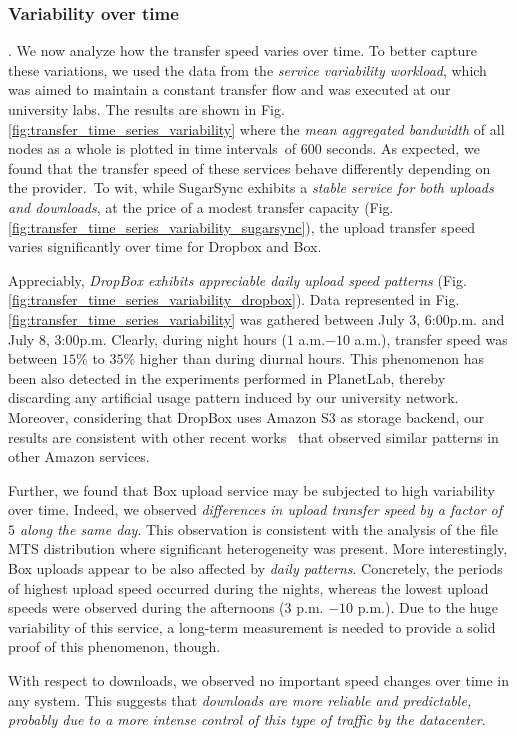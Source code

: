 \subsubsection*{Variability over time}. We now analyze how the
transfer speed varies over time. To better capture these variations, 
we used the data from the \textit{service variability workload}, 
which was aimed to maintain a constant transfer flow and was executed at our university labs.
The results are shown in Fig. \ref{fig:transfer_time_series_variability} 
where the \textit{mean aggregated bandwidth} of all nodes as a whole is plotted in time 
intervals~of $600$ seconds. As expected, we found that the transfer speed of these services behave
differently depending on the provider.~To wit, while SugarSync
exhibits a \textit{stable service for both uploads and downloads}, at
the price of a modest transfer capacity (Fig. \ref{fig:transfer_time_series_variability_sugarsync}), the upload transfer
speed varies significantly over time for Dropbox and Box.

Appreciably, \textit{DropBox exhibits appreciable 
daily upload speed patterns} (Fig. \ref{fig:transfer_time_series_variability_dropbox}). 
Data represented in Fig. \ref{fig:transfer_time_series_variability} was gathered between
July $3$, $6$:$00$p.m. and July $8$, $3$:$00$p.m. Clearly, during 
night hours ($1$ a.m.$-10$ a.m.), transfer speed was between $15\%$ to
$35\%$ higher than during diurnal hours. This phenomenon has been also
detected in the experiments performed in PlanetLab, thereby discarding
any artificial usage pattern induced by our university network. Moreover, considering
that DropBox uses Amazon S3 as storage backend, our results are consistent with
other recent works~\cite{variability_ccgrid11} that observed 
similar patterns in other Amazon services.

Further, we found that Box upload service may be subjected to
high variability over time. Indeed, we observed \textit{differences in
upload transfer speed by a factor of $5$  along the same day}. This observation is consistent 
with the analysis of the file MTS distribution where significant
heterogeneity was present. More interestingly, Box uploads 
appear to be also affected by \textit{daily patterns}. Concretely, 
the periods of highest upload speed occurred during
the nights, whereas the lowest upload speeds were observed during the
afternoons ($3$ p.m. $-10$ p.m.). Due to the huge variability
of this service, a long-term measurement is needed to provide
a solid proof of this phenomenon, though.


With respect to downloads, we observed no important
speed changes over time in any system. This suggests that
\textit{downloads are more reliable and predictable, probably
due to a more intense control of this type of traffic by
the datacenter}.